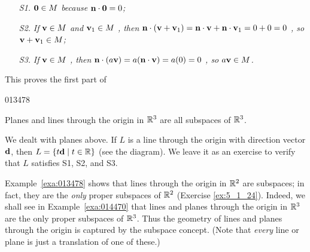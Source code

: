 \begin{itemize}
\item[\textit{S1.}]  $\textbf{0} \in M$ \textit{because} $\textbf{n} \cdot \textbf{0} = 0$\textit{;}

\item[\textit{S2.}] \textit{If} $\textbf{v} \in M$ \textit{and} $\textbf{v}_{1} \in M$ \textit{, then} $\textbf{n} \cdot (\textbf{v} + \textbf{v}_{1}) = \textbf{n} \cdot \textbf{v} + \textbf{n} \cdot \textbf{v}_{1} = 0 + 0 = 0$ \textit{, so} $\textbf{v} + \textbf{v}_{1} \in M$\textit{;}

\item[\textit{S3.}] \textit{If} $\textbf{v} \in M$ \textit{, then} $\textbf{n} \cdot (a\textbf{v}) = a(\textbf{n} \cdot \textbf{v}) = a(0) = 0$ \textit{, so } $a\textbf{v} \in M$\textit{.}

\end{itemize}

\noindent This proves the first part of

\begin{example}{}{013478}
\begin{wrapfigure}[5]{l}{5cm}
\centering

\end{wrapfigure}

\setlength{\rightskip}{0pt plus 200pt}
Planes and lines through the origin in $\mathbb{R}^3$ are all subspaces of $\mathbb{R}^3$.

\begin{solution}
We dealt with planes above. If $L$ is a line through the origin with direction vector $\textbf{d}$, then $L = \{t\textbf{d} \mid t \in \mathbb{R}\}$ (see the diagram). We leave it as an exercise to verify that $L$ satisfies S1, S2, and S3.
\vspace{4em}
\end{solution}
\end{example}

\noindent Example~\ref{exa:013478} shows that lines through the origin in $\mathbb{R}^2$ are subspaces; in fact, they are the \textit{only} proper subspaces of $\mathbb{R}^2$ (Exercise \ref{ex:5_1_24}). Indeed, we shall see in Example~\ref{exa:014470} that lines and planes through the origin in $\mathbb{R}^3$ are the only proper subspaces of $\mathbb{R}^3$. Thus the geometry of lines and planes through the origin is captured by the subspace concept. (Note that \textit{every} line or plane is just a translation of one of these.)

